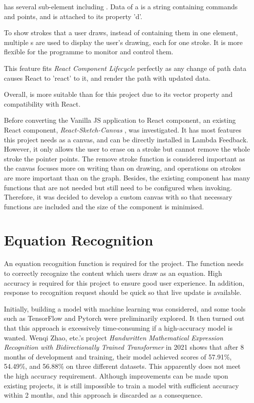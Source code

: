 \documentclass[12pt,twoside]{report}
\begin{document}
 has several sub-element including . Data of a  is a string containing commands and points, and is attached to its property 'd'. 

To show strokes that a user draws, instead of containing them in one  element, multiple s are used to display the user's drawing, each for one stroke. It is more flexible for the programme to monitor and control them. 

This feature fits \textit{React Component Lifecycle} perfectly as any change of path data causes React to 'react' to it, and render the path with updated data.

Overall,  is more suitable than  for this project due to its vector property and compatibility with React.

Before converting the Vanilla JS application to React component, an
existing React component, \textit{React-Sketch-Canvas}
\cite{react-sketch-canvas}, was investigated. It has most features this project
needs as a canvas, and can be directly installed in Lambda Feedback. However, it
only allows the user to erase on a stroke but cannot remove the whole stroke the
pointer points. The remove stroke function is considered important as the canvas
focuses more on writing than on drawing, and operations on strokes are more
important than on the graph. Besides, the existing component has many functions that are not needed but still need to be configured when invoking. Therefore, it was decided to develop a custom canvas with  so that necessary functions are included and the size of the component is minimised.



\section{Equation Recognition}
\label{bgEqnRecognition}
An equation recognition function is required for the project. The function needs
to correctly recognize the content which users draw as an equation. High accuracy is required for this project to ensure good user experience. In addition, response to recognition request should be quick so that live update is available.

Initially, building a model with machine learning was considered, and some tools
such as TensorFlow and Pytorch were preliminarily explored. It then turned out
that this approach is excessively time-consuming if a high-accuracy model is
wanted. Wenqi Zhao, etc.'s project \textit{Handwritten Mathematical Expression
Recognition with Bidirectionally Trained Transformer} \cite{zhao2021handwritten}
in 2021 shows that after 8 months of development and training, their model
achieved scores of 57.91\%, 54.49\%, and 56.88\% on three different datasets.
This apparently does not meet the high accuracy requirement. Although improvements can be made upon existing projects, it is still impossible to train a model with sufficient accuracy within 2 months, and this approach is discarded as a consequence.
\end{document}
